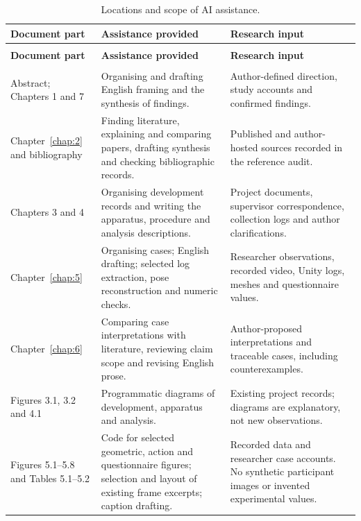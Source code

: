 \clearpage
\begingroup
{}
\fontsize{9.5}{11.685}\selectfont
\setlength{\tabcolsep}{2.2pt}
\renewcommand{\arraystretch}{1.18}
\begin{longtable}{@{}>{\raggedright\arraybackslash}p{36.285mm}>{\raggedright\arraybackslash}p{62.763mm}>{\raggedright\arraybackslash}p{57.860mm}@{}}
\caption[Locations and scope of AI assistance.]{Locations and scope of AI assistance.}\label{tab:D-1}\\
\toprule
\textbf{Document part} & \textbf{Assistance provided} & \textbf{Research input} \\
\midrule
\endfirsthead
\multicolumn{3}{l}{\small\itshape Table \thetable{} (continued)}\\
\toprule
\textbf{Document part} & \textbf{Assistance provided} & \textbf{Research input} \\
\midrule
\endhead
\midrule
\multicolumn{3}{r}{\small Continued on next page}\\
\endfoot
\bottomrule
\endlastfoot
Abstract; Chapters 1 and 7 & Organising and drafting English framing and the synthesis of findings. & Author-defined direction, study accounts and confirmed findings. \\
\addlinespace[3pt]
Chapter~\ref{chap:2} and bibliography & Finding literature, explaining and comparing papers, drafting synthesis and checking bibliographic records. & Published and author-hosted sources recorded in the reference audit. \\
\addlinespace[3pt]
Chapters 3 and 4 & Organising development records and writing the apparatus, procedure and analysis descriptions. & Project documents, supervisor correspondence, collection logs and author clarifications. \\
\addlinespace[3pt]
Chapter~\ref{chap:5} & Organising cases; English drafting; selected log extraction, pose reconstruction and numeric checks. & Researcher observations, recorded video, Unity logs, meshes and questionnaire values. \\
\addlinespace[3pt]
Chapter~\ref{chap:6} & Comparing case interpretations with literature, reviewing claim scope and revising English prose. & Author-proposed interpretations and traceable cases, including counterexamples. \\
\addlinespace[3pt]
Figures 3.1, 3.2 and 4.1 & Programmatic diagrams of development, apparatus and analysis. & Existing project records; diagrams are explanatory, not new observations. \\
\addlinespace[3pt]
Figures 5.1--5.8 and Tables 5.1--5.2 & Code for selected geometric, action and questionnaire figures; selection and layout of existing frame excerpts; caption drafting. & Recorded data and researcher case accounts. No synthetic participant images or invented experimental values. \\

\end{longtable}
